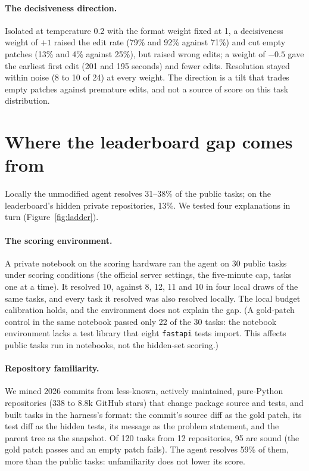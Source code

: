 \documentclass[11pt]{article}
\begin{document}
\paragraph{The decisiveness direction.} Isolated at temperature 0.2 with the format weight fixed at 1, a decisiveness weight of $+1$ raised the edit rate (79\% and 92\% against 71\%) and cut empty patches (13\% and 4\% against 25\%), but raised wrong edits; a weight of $-0.5$ gave the earliest first edit (201 and 195 seconds) and fewer edits. Resolution stayed within noise (8 to 10 of 24) at every weight. The direction is a tilt that trades empty patches against premature edits, and not a source of score on this task distribution.

\section{Where the leaderboard gap comes from}\label{sec:gap}

Locally the unmodified agent resolves 31--38\% of the public tasks; on the leaderboard's hidden private repositories, 13\%. We tested four explanations in turn (Figure~\ref{fig:ladder}).

\paragraph{The scoring environment.} A private notebook on the scoring hardware ran the agent on 30 public tasks under scoring conditions (the official server settings, the five-minute cap, tasks one at a time). It resolved 10, against 8, 12, 11 and 10 in four local draws of the same tasks, and every task it resolved was also resolved locally. The local budget calibration holds, and the environment does not explain the gap. (A gold-patch control in the same notebook passed only 22 of the 30 tasks: the notebook environment lacks a test library that eight \texttt{fastapi} tests import. This affects public tasks run in notebooks, not the hidden-set scoring.)

\paragraph{Repository familiarity.} We mined 2026 commits from less-known, actively maintained, pure-Python repositories (338 to 8.8k GitHub stars) that change package source and tests, and built tasks in the harness's format: the commit's source diff as the gold patch, its test diff as the hidden tests, its message as the problem statement, and the parent tree as the snapshot. Of 120 tasks from 12 repositories, 95 are sound (the gold patch passes and an empty patch fails). The agent resolves 59\% of them, more than the public tasks: unfamiliarity does not lower its score.
\end{document}
